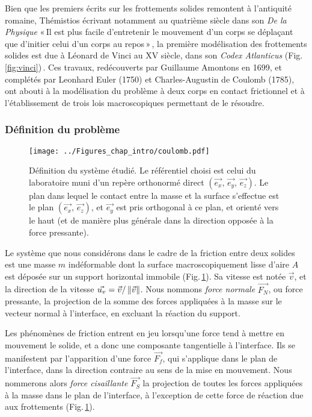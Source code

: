Bien que les premiers écrits sur les frottements solides remontent à l'antiquité romaine, Thémistios écrivant notamment au quatrième siècle dans son \textit{De la Physique} «\,Il est plus facile d'entretenir le mouvement d'un corps se déplaçant que d'initier celui d'un corps au repos\,»\,\cite{themistius_aristotle_2008}, la première modélisation des frottements solides est due à Léonard de Vinci au XV siècle, dans son \textit{Codex Atlanticus} (Fig.\,\ref{fig:vinci})\,\cite{hutchings_leonardo_2016}. Ces travaux, redécouverts par Guillaume Amontons en 1699, et complétés par Leonhard Euler (1750) et Charles-Augustin de Coulomb (1785), ont abouti à la modélisation du problème à deux corps en contact frictionnel et à l'établissement de trois lois macroscopiques permettant de le résoudre.

\subsubsection{Définition du problème}

\begin{figure}[htb]
\centering
\texttt{[image: ../Figures\_chap\_intro/coulomb.pdf]}
\caption[Référentiel utilisé pour les lois de Coulomb]{Définition du système étudié. Le référentiel choisi est celui du laboratoire muni d'un repère orthonormé direct $\left(\vec{e_x},\,\vec{e_y},\,\vec{e_z}\right)$. Le plan dans lequel le contact entre la masse et la surface s'effectue est le plan  $\left(\vec{e_x},\,\vec{e_z}\right)$, et $\vec{e_y}$ est pris orthogonal à ce plan, et orienté vers le haut (et de manière plus générale dans la direction opposée à la force pressante).
}
\label{fig:coulomb}
\end{figure}

Le système que nous considérons dans le cadre de la friction entre deux solides est une masse $m$ indéformable dont la surface macroscopiquement lisse d'aire $A$ est déposée sur un support horizontal immobile (Fig.\,\ref{fig:coulomb}). Sa vitesse est notée $\vec{v}$, et la direction de la vitesse $\vec{u_v} = \vec{v}/\left\lVert \vec{v} \right\rVert$. Nous nommons \textit{force normale} $\vec{F_N}$, ou force pressante, la projection de la somme des forces appliquées à la masse sur le vecteur normal à l'interface, en excluant la réaction du support.

Les phénomènes de friction entrent en jeu lorsqu'une force tend à mettre en mouvement le solide, et a donc une composante tangentielle à l'interface. Ils se manifestent par l'apparition d'une force $\vec{F_f}$, qui s'applique dans le plan de l'interface, dans la direction contraire au sens de la mise en mouvement. Nous nommerons alors \textit{force cisaillante} $\vec{F_S}$ la projection de toutes les forces appliquées à la masse dans le plan de l'interface, à l'exception de cette force de réaction due aux frottements (Fig.\,\ref{fig:coulomb}).


